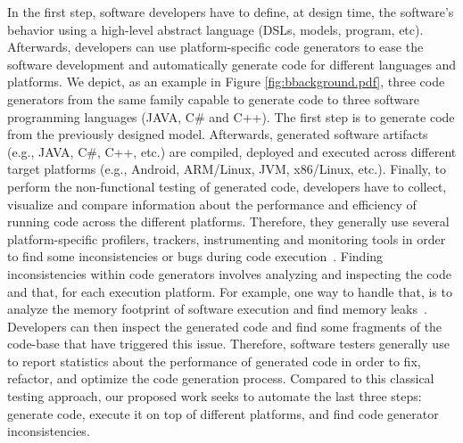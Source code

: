 In the first step, software developers have to define, at design time, the software's behavior using a high-level abstract language (DSLs, models, program, etc). Afterwards, developers can use platform-specific code generators to ease the software development and automatically generate code for different languages and platforms. We depict, as an example in Figure \ref{fig:bbackground.pdf}, three code generators from the same family capable to generate code to three software programming languages (JAVA, C\# and C++). The first step is to generate code from the previously designed model.
Afterwards, generated software artifacts (e.g., JAVA, C\#, C++, etc.) are compiled, deployed and executed across different target platforms (e.g., Android, ARM/Linux, JVM, x86/Linux, etc.). 
Finally, to perform the non-functional testing of generated code, developers have to collect, visualize and compare information about the performance and efficiency of running code across the different platforms. 
Therefore, they generally use several platform-specific profilers, trackers, instrumenting and monitoring tools in order to find some inconsistencies or bugs during code execution~\cite{guana2014chaintracker,delgado2004taxonomy}. Finding inconsistencies within code generators involves analyzing and inspecting the code and that, for each execution platform. For example, one way to handle that, is to analyze the memory footprint of software execution and find memory leaks~\cite{nethercote2007valgrind}. Developers can then inspect the generated code and find some fragments of the code-base that have triggered this issue. %
Therefore, software testers generally use to report statistics about the performance of generated code in order to fix, refactor, and optimize the code generation process. Compared to this classical testing approach, our proposed work seeks to automate the last three steps: generate code, execute it on top of different platforms, and find code generator inconsistencies. 



